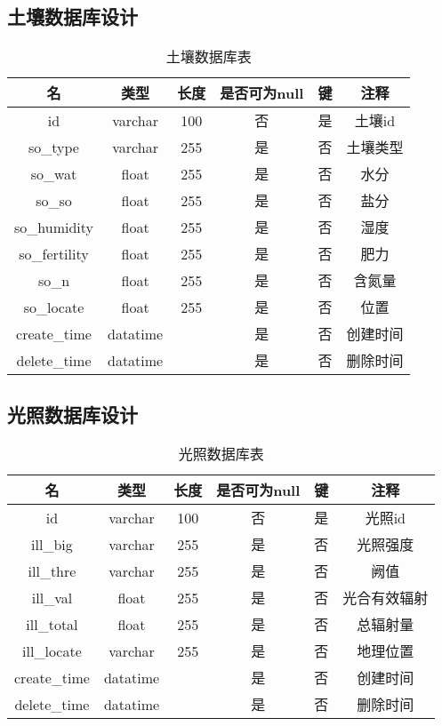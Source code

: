 \subsection{土壤数据库设计}
\begin{table}[H]
	\centering
	\caption[土壤数据]{土壤数据库表}
	\begin{tabular}{cccccc}
		\toprule
		名            & 类型      & 长度 &是否可为null & 键 & 注释\\
		\midrule
		id           & varchar  & 100  & 否 & 是 & 土壤id \\
		so\_type     & varchar  & 255  &是  & 否 & 土壤类型   \\
		so\_wat      & float    & 255  &是  & 否 & 水分   \\
		so\_so       & float    & 255  & 是 & 否 & 盐分     \\
        so\_humidity & float    & 255  & 是 & 否 & 湿度     \\
        so\_fertility & float    & 255  & 是 & 否 & 肥力     \\
        so\_n       & float    & 255  & 是 & 否 & 含氮量     \\
        so\_locate  & float    & 255  & 是 & 否 & 位置     \\
		create\_time  & datatime &      &是  & 否 & 创建时间   \\
		delete\_time  &datatime  &      & 是 & 否 & 删除时间   \\ 
		\bottomrule
	\end{tabular}
\end{table}

\subsection{光照数据库设计}
\begin{table}[H]
	\centering
	\caption[光照数据]{光照数据库表}
	\begin{tabular}{cccccc}
		\toprule
		名            & 类型      & 长度 &是否可为null & 键 & 注释\\
		\midrule
		id            & varchar  & 100  & 否 & 是 & 光照id \\
		ill\_big     & varchar  & 255  &是  & 否 & 光照强度   \\
		ill\_thre      & varchar  & 255  &是  & 否 & 阙值   \\
		ill\_val   & float    & 255  &是  & 否 & 光合有效辐射 \\
		ill\_total     & float    & 255  &是  & 否 & 总辐射量   \\
		ill\_locate       & varchar    & 255  & 是 & 否 & 地理位置     \\
		create\_time  & datatime &      &是  & 否 & 创建时间   \\
		delete\_time  &datatime  &      & 是 & 否 & 删除时间   \\ 
		\bottomrule
	\end{tabular}
\end{table}

